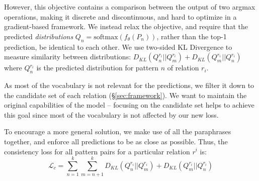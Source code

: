 

However, this objective contains a comparison between the output of two argmax operations, making it discrete and discontinuous, and hard to optimize in a gradient-based framework. We instead relax the objective, and require that the predicted \emph{distributions} $Q_n = \mbox{softmax}(f_\theta(P_n))$, rather than the top-1 prediction, be identical to each other. %
We use two-sided KL Divergence to measure similarity between distributions: $D_{KL}(Q_n^{r_i}||Q_m^{r_i}) + D_{KL}(Q_m^{r_i}||Q_n^{r_i})$
where $Q_n^{r_i}$ is the predicted distribution for pattern $n$ of relation $r_i$.


As most of the vocabulary is not relevant for the
predictions, we filter it down to the candidate set of each
relation (\S\ref{sec:framework}). We want to
maintain the original capabilities of the
model -- focusing on the candidate set helps to achieve this
goal since most of the vocabulary is not affected by our new
loss.


To encourage a more general solution, we make use of all the paraphrases together, and enforce all predictions to be as close as possible.
Thus, the consistency loss for all pattern pairs for a particular relation $r^i$ is:
\[
\mathcal{L}_{c} = \sum_{n=1}^k \sum_{m=n+1}^k D_{KL}(Q^{r_i}_n||Q^{r_i}_m) + D_{KL}(Q^{r_i}_m||Q^{r_i}_n)
\]


